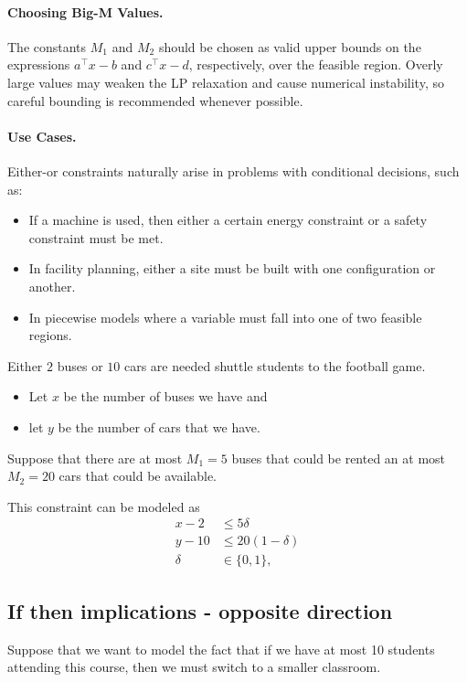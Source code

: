 \paragraph{Choosing Big-M Values.}
The constants \(M_1\) and \(M_2\) should be chosen as valid upper bounds on the expressions \(a^\top x - b\) and \(c^\top x - d\), respectively, over the feasible region. Overly large values may weaken the LP relaxation and cause numerical instability, so careful bounding is recommended whenever possible.

\paragraph{Use Cases.}
Either-or constraints naturally arise in problems with conditional decisions, such as:
\begin{itemize}
    \item If a machine is used, then either a certain energy constraint or a safety constraint must be met.
    \item In facility planning, either a site must be built with one configuration or another.
    \item In piecewise models where a variable must fall into one of two feasible regions.
\end{itemize}

\begin{example}{}{}
Either $2$ buses or $10$ cars are needed shuttle students to the football game.  
\begin{itemize}
\item Let $x$ be the number of buses we have and 
\item let $y$ be the number of cars that we have.  
\end{itemize}
Suppose that there are at most $M_1 = 5$ buses that could be rented an at most $M_2 = 20$ cars that could be available.

This constraint can be modeled as 
\begin{equation}
\begin{split}
x - 2 &\leq 5\delta\\
y - 10 &\leq 20 (1-\delta)\\
\delta &\in \{0,1\},
\end{split}
\end{equation}
\end{example}
\subsection{If then implications - opposite direction}
Suppose that we want to model the fact that if we have at most 10 students attending this course, then we must switch to a smaller classroom.   

